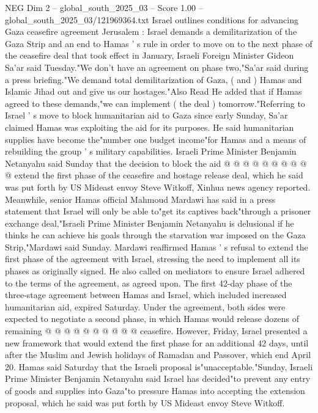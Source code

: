 \begin{textsample}{NEG Dim 2 – global\_south\_2025\_03 – Score 1.00 – global\_south\_2025\_03/121969364.txt}  \label{ex:f2_neg_163}
Israel outlines conditions for advancing Gaza ceasefire agreement Jerusalem : Israel demands a demilitarization of the Gaza Strip and an end to Hamas ' s rule in order to move on to the next phase of the ceasefire deal that took effect in January, Israeli Foreign Minister Gideon Sa'ar said Tuesday."We don't have an agreement on phase two,"Sa'ar said during a press briefing."We demand total demilitarization of Gaza, ( and ) Hamas and Islamic Jihad out and give us our hostages."Also Read He added that if Hamas agreed to these demands,"we can implement ( the deal ) tomorrow."Referring to Israel ' s move to block humanitarian aid to Gaza since early Sunday, Sa'ar claimed Hamas was exploiting the aid for its purposes.
He said humanitarian supplies have become the"number one budget income"for Hamas and a means of rebuilding the group ' s military capabilities.
Israeli Prime Minister Benjamin Netanyahu said Sunday that the decision to block the aid @ @ @ @ @ @ @ @ @ @ extend the first phase of the ceasefire and hostage release deal, which he said was put forth by US Mideast envoy Steve Witkoff, Xinhua news agency reported.
Meanwhile, senior Hamas official Mahmoud Mardawi has said in a press statement that Israel will only be able to"get its captives back"through a prisoner exchange deal,"Israeli Prime Minister Benjamin Netanyahu is delusional if he thinks he can achieve his goals through the starvation war imposed on the Gaza Strip,"Mardawi said Sunday.
Mardawi reaffirmed Hamas ' s refusal to extend the first phase of the agreement with Israel, stressing the need to implement all its phases as originally signed.
He also called on mediators to ensure Israel adhered to the terms of the agreement, as agreed upon.
The first 42-day phase of the three-stage agreement between Hamas and Israel, which included increased humanitarian aid, expired Saturday.
Under the agreement, both sides were expected to negotiate a second phase, in which Hamas would release dozens of remaining @ @ @ @ @ @ @ @ @ @ ceasefire.
However, Friday, Israel presented a new framework that would extend the first phase for an additional 42 days, until after the Muslim and Jewish holidays of Ramadan and Passover, which end April 20.
Hamas said Saturday that the Israeli proposal is"unacceptable."Sunday, Israeli Prime Minister Benjamin Netanyahu said Israel has decided"to prevent any entry of goods and supplies into Gaza"to pressure Hamas into accepting the extension proposal, which he said was put forth by US Mideast envoy Steve Witkoff.

\end{textsample}
